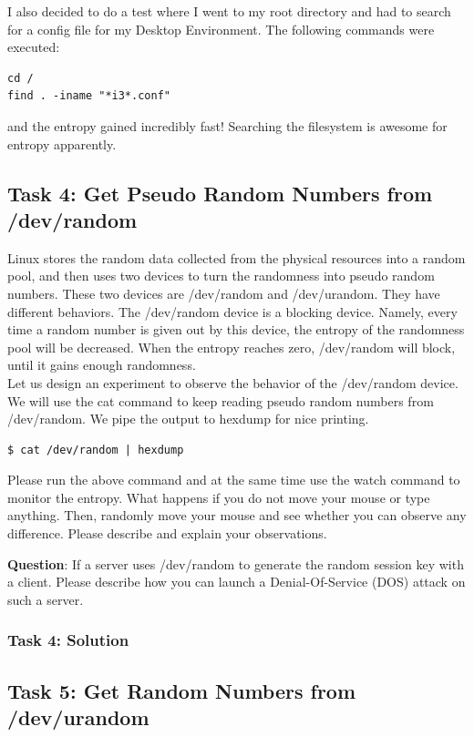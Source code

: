 \documentclass[12pt]{article}
\newcommand\tab[1][0.5cm]{\hspace*{#1}}
\begin{document}
I also decided to do a test where I went to my root directory and had to search for a config file for my Desktop Environment. The following commands were executed:
\begin{verbatim}
cd /
find . -iname "*i3*.conf"
\end{verbatim}
and the entropy gained incredibly fast! Searching the filesystem is awesome for entropy apparently.

\subsection{Task 4: Get Pseudo Random Numbers from /dev/random}
Linux stores the random data collected from the physical resources into a random pool, and then uses
two devices to turn the randomness into pseudo random numbers. These two devices are /dev/random
and /dev/urandom. They have different behaviors. The /dev/random device is a blocking device.
Namely, every time a random number is given out by this device, the entropy of the randomness pool will be
decreased. When the entropy reaches zero, /dev/random will block, until it gains enough randomness. \\
\tab Let us design an experiment to observe the behavior of the /dev/random device. We will use the cat
command to keep reading pseudo random numbers from /dev/random. We pipe the output to hexdump
for nice printing.
\begin{verbatim}
$ cat /dev/random | hexdump
\end{verbatim}
\tab Please run the above command and at the same time use the watch command to monitor the entropy.
What happens if you do not move your mouse or type anything. Then, randomly move your mouse and see
whether you can observe any difference. Please describe and explain your observations.

\textbf{Question}: If a server uses /dev/random to generate the random session key with a client. Please
describe how you can launch a Denial-Of-Service (DOS) attack on such a server.

\subsubsection{Task 4: Solution}



\subsection{Task 5: Get Random Numbers from /dev/urandom}
\end{document}
